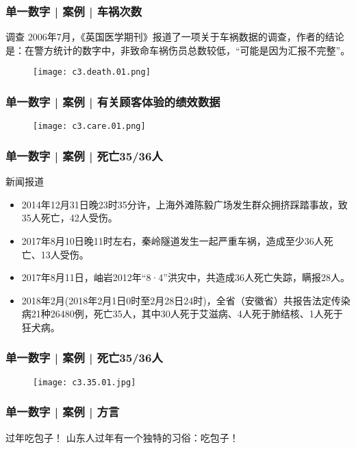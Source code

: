 \begin{frame}
  \frametitle{单一数字 | 案例 | 车祸次数}
  \begin{block}{调查}
    2006年7月，《英国医学期刊》报道了一项关于车祸数据的调查，作者的结论是：在警方统计的数字中，非致命车祸伤员总数较低，“可能是因为汇报不完整”。
  \end{block}
  \begin{figure}
    \centering
    \texttt{[image: c3.death.01.png]}
  \end{figure}
\end{frame}

\begin{frame}
  \frametitle{单一数字 | 案例 | 有关顾客体验的绩效数据}
  \begin{figure}
    \centering
    \texttt{[image: c3.care.01.png]}
  \end{figure}
\end{frame}

\begin{frame}
  \frametitle{单一数字 | 案例 | 死亡35/36人}
  \begin{block}{新闻报道}
    \begin{itemize}
      \item 2014年12月31日晚23时35分许，上海外滩陈毅广场发生群众拥挤踩踏事故，致35人死亡，42人受伤。
      \item 2017年8月10日晚11时左右，秦岭隧道发生一起严重车祸，造成至少36人死亡、13人受伤。
      \item 2017年8月11日，岫岩2012年“8·4”洪灾中，共造成36人死亡失踪，瞒报28人。
      \item 2018年2月(2018年2月1日0时至2月28日24时)，全省（安徽省）共报告法定传染病21种26480例，死亡35人，其中30人死于艾滋病、4人死于肺结核、1人死于狂犬病。
    \end{itemize}
  \end{block}
\end{frame}

\begin{frame}
  \frametitle{单一数字 | 案例 | 死亡35/36人}
  \begin{figure}
    \centering
    \texttt{[image: c3.35.01.jpg]}
  \end{figure}
\end{frame}

\begin{frame}
  \frametitle{单一数字 | 案例 | 方言}
  \begin{block}{过年吃包子！}
    山东人过年有一个独特的习俗：吃包子！
  \end{block}
  \begin{figure}
    \centering
  \end{figure}
\end{frame}

